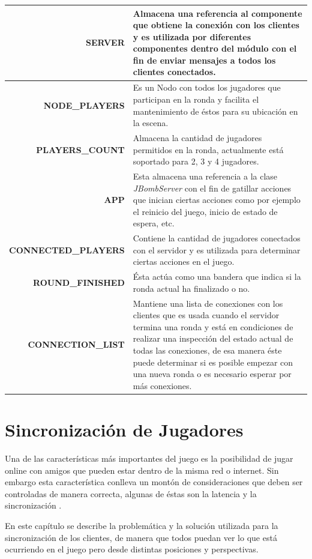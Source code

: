 \documentclass[a4paper,12pt,openany,oneside]{book}
\begin{document}
\begin{flushleft}
\begin{tabular}{|r|p{8.3cm}|}
\hline
\textbf{SERVER} & Almacena una referencia al componente que obtiene la conexión con los clientes y es utilizada por diferentes componentes dentro del módulo con el fin de enviar mensajes a todos los clientes conectados.\\	
\hline
\textbf{NODE\_PLAYERS} & Es un Nodo con todos los jugadores que participan en la ronda y facilita el mantenimiento de éstos para su ubicación en la escena.\\	
\hline
\textbf{PLAYERS\_COUNT} & Almacena la cantidad de jugadores permitidos en la ronda, actualmente está soportado para 2, 3 y 4 jugadores.\\	
\hline
\textbf{APP} & Esta almacena una referencia a la clase \textit{JBombServer} con el fin de gatillar acciones que inician ciertas acciones como por ejemplo el reinicio del juego, inicio de estado de espera, etc.\\	
\hline
\textbf{CONNECTED\_PLAYERS} & Contiene la cantidad de jugadores conectados con el servidor y es utilizada para determinar ciertas acciones en el juego.\\	
\hline
\textbf{ROUND\_FINISHED} & Ésta actúa como una bandera que indica si la ronda actual ha finalizado o no.\\	
\hline
\textbf{CONNECTION\_LIST} & Mantiene una lista de conexiones con los clientes que es usada cuando el servidor termina una ronda y está en condiciones de realizar una inspección del estado actual de todas las conexiones, de esa manera éste puede determinar si es posible empezar con una nueva ronda o es necesario esperar por más conexiones.\\	
\hline
\end{tabular}
\end{flushleft}
\chapter{Sincronización de Jugadores}
Una de las características más importantes del juego es la posibilidad de jugar online con amigos que pueden estar dentro de la misma red o internet. Sin embargo esta característica conlleva un montón de consideraciones que deben ser controladas de manera correcta, algunas de éstas son la latencia \cite{VALVE2} y la sincronización \cite{VALVE1}.

En este capítulo se describe la problemática y la solución utilizada para la sincronización de los clientes, de manera que todos puedan ver lo que está ocurriendo en el juego pero desde distintas posiciones y perspectivas.
\end{document}
